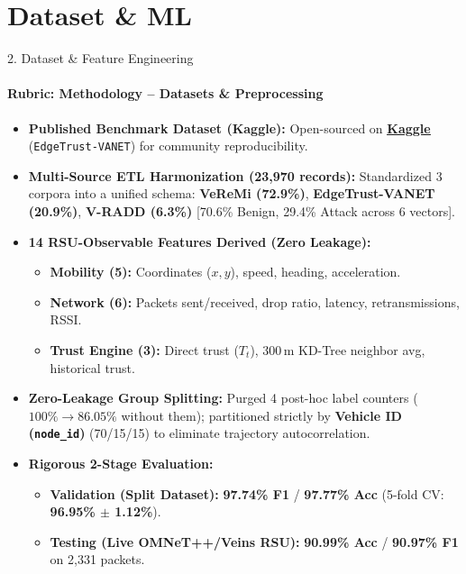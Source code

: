 \section{Dataset \& ML}
\begin{frame}{2. Dataset \& Feature Engineering}
    \framesubtitle{Rubric: Methodology -- Datasets \& Preprocessing}
    \small
    \begin{itemize}
        \item \textbf{Published Benchmark Dataset (Kaggle):} Open-sourced on \href{https://www.kaggle.com/datasets/mouniksai/vehicular-misbehavior-dataset-edgetrust-vanet/data}{\textbf{\underline{Kaggle}}} (\texttt{EdgeTrust-VANET}) for community reproducibility.
        
        \item \textbf{Multi-Source ETL Harmonization (23{,}970 records):} Standardized 3 corpora into a unified schema: \textbf{VeReMi (72.9\%)}, \textbf{EdgeTrust-VANET (20.9\%)}, \textbf{V-RADD (6.3\%)} [70.6\% Benign, 29.4\% Attack across 6 vectors].
        
        \item \textbf{14 RSU-Observable Features Derived (Zero Leakage):}
        \begin{itemize}
            \item \textbf{Mobility (5):} Coordinates ($x, y$), speed, heading, acceleration.
            \item \textbf{Network (6):} Packets sent/received, drop ratio, latency, retransmissions, RSSI.
            \item \textbf{Trust Engine (3):} Direct trust ($T_t$), 300\,m KD-Tree neighbor avg, historical trust.
        \end{itemize}
        
        \item \textbf{Zero-Leakage Group Splitting:} Purged 4 post-hoc label counters ($100\% \to 86.05\%$ without them); partitioned strictly by \textbf{Vehicle ID (\texttt{node\_id})} (70/15/15) to eliminate trajectory autocorrelation.
        
        \item \textbf{Rigorous 2-Stage Evaluation:}
        \begin{itemize}
            \item \textbf{Validation (Split Dataset):} \textbf{97.74\% F1} / \textbf{97.77\% Acc} (5-fold CV: \textbf{96.95\% $\pm$ 1.12\%}).
            \item \textbf{Testing (Live OMNeT++/Veins RSU):} \textbf{90.99\% Acc} / \textbf{90.97\% F1} on 2{,}331 packets.
        \end{itemize}
    \end{itemize}
\end{frame}

